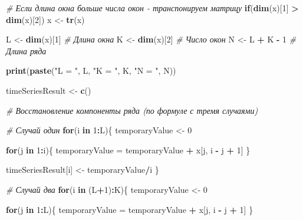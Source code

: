 \documentclass[
]{article}
\newenvironment{Shaded}{\begin{snugshade}}{\end{snugshade}}
\newcommand{\CommentTok}[1]{\textcolor[rgb]{0.56,0.35,0.01}{\textit{#1}}}
\newcommand{\ControlFlowTok}[1]{\textcolor[rgb]{0.13,0.29,0.53}{\textbf{#1}}}
\newcommand{\DecValTok}[1]{\textcolor[rgb]{0.00,0.00,0.81}{#1}}
\newcommand{\FunctionTok}[1]{\textcolor[rgb]{0.13,0.29,0.53}{\textbf{#1}}}
\newcommand{\NormalTok}[1]{#1}
\newcommand{\OtherTok}[1]{\textcolor[rgb]{0.56,0.35,0.01}{#1}}
\newcommand{\SpecialCharTok}[1]{\textcolor[rgb]{0.81,0.36,0.00}{\textbf{#1}}}
\newcommand{\StringTok}[1]{\textcolor[rgb]{0.31,0.60,0.02}{#1}}
\begin{document}
\begin{Shaded}
\begin{Highlighting}[]
  \CommentTok{\# Если длина окна больше числа окон {-} транспонируем матрицу}
  \ControlFlowTok{if}\NormalTok{(}\FunctionTok{dim}\NormalTok{(x)[}\DecValTok{1}\NormalTok{] }\SpecialCharTok{\textgreater{}} \FunctionTok{dim}\NormalTok{(x)[}\DecValTok{2}\NormalTok{]) x }\OtherTok{\textless{}{-}} \FunctionTok{tr}\NormalTok{(x)}

\NormalTok{  L }\OtherTok{\textless{}{-}} \FunctionTok{dim}\NormalTok{(x)[}\DecValTok{1}\NormalTok{] }\CommentTok{\# Длина окна}
\NormalTok{  K }\OtherTok{\textless{}{-}} \FunctionTok{dim}\NormalTok{(x)[}\DecValTok{2}\NormalTok{] }\CommentTok{\# Число окон}
\NormalTok{  N }\OtherTok{\textless{}{-}}\NormalTok{ L }\SpecialCharTok{+}\NormalTok{ K }\SpecialCharTok{{-}} \DecValTok{1} \CommentTok{\# Длина ряда}

  \FunctionTok{print}\NormalTok{(}\FunctionTok{paste}\NormalTok{(}\StringTok{"L = "}\NormalTok{, L, }\StringTok{"K = "}\NormalTok{, K, }\StringTok{"N = "}\NormalTok{, N))}


\NormalTok{  timeSeriesResult }\OtherTok{\textless{}{-}} \FunctionTok{c}\NormalTok{()}

  \CommentTok{\# Восстановление компоненты ряда (по формуле с тремя случаями)}

  \CommentTok{\# Случай один}
  \ControlFlowTok{for}\NormalTok{(i }\ControlFlowTok{in} \DecValTok{1}\SpecialCharTok{:}\NormalTok{L)\{}
\NormalTok{    temporaryValue }\OtherTok{\textless{}{-}} \DecValTok{0}

    \ControlFlowTok{for}\NormalTok{(j }\ControlFlowTok{in} \DecValTok{1}\SpecialCharTok{:}\NormalTok{i)\{}
\NormalTok{      temporaryValue }\OtherTok{=}\NormalTok{ temporaryValue }\SpecialCharTok{+}\NormalTok{ x[j, i }\SpecialCharTok{{-}}\NormalTok{ j }\SpecialCharTok{+} \DecValTok{1}\NormalTok{]}
\NormalTok{    \}}

\NormalTok{    timeSeriesResult[i] }\OtherTok{\textless{}{-}}\NormalTok{ temporaryValue}\SpecialCharTok{/}\NormalTok{i}
\NormalTok{  \}}

  \CommentTok{\# Случай два}
  \ControlFlowTok{for}\NormalTok{(i }\ControlFlowTok{in}\NormalTok{ (L}\SpecialCharTok{+}\DecValTok{1}\NormalTok{)}\SpecialCharTok{:}\NormalTok{K)\{}
\NormalTok{    temporaryValue }\OtherTok{\textless{}{-}} \DecValTok{0}

    \ControlFlowTok{for}\NormalTok{(j }\ControlFlowTok{in} \DecValTok{1}\SpecialCharTok{:}\NormalTok{L)\{}
\NormalTok{      temporaryValue }\OtherTok{=}\NormalTok{ temporaryValue }\SpecialCharTok{+}\NormalTok{ x[j, i }\SpecialCharTok{{-}}\NormalTok{ j }\SpecialCharTok{+} \DecValTok{1}\NormalTok{]}
\NormalTok{    \}}


\end{Highlighting}
\end{Shaded}
\end{document}
